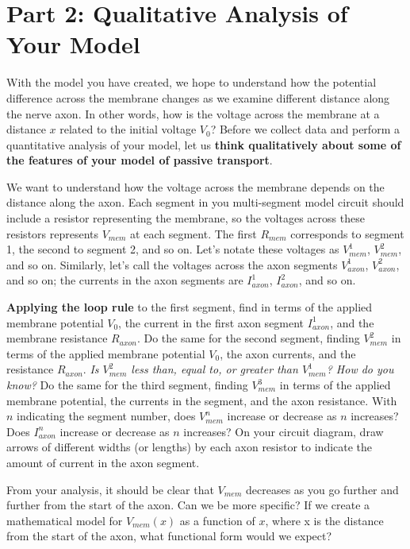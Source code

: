 \section*{Part 2: Qualitative Analysis of Your Model}
With the model you have created, we hope to understand how the potential difference across the membrane changes as we examine different distance along the nerve axon.
In other words, how is the voltage across the membrane at a distance $x$ related to the initial voltage $V_{0}$?
Before we collect data and perform a quantitative analysis of your model, let us \textbf{think qualitatively about some of the features of your model of passive transport}.
\par 
We want to understand how the voltage across the membrane depends on the distance along the axon.
Each segment in you multi-segment model circuit should include a resistor representing the membrane, so the voltages across these resistors represents $V_{mem}$ at each segment.
The first $R_{mem}$ corresponds to segment 1, the second to segment 2, and so on. 
Let's notate these voltages as $V_{mem}^{1}$, $V_{mem}^{2}$, and so on.
Similarly, let's call the voltages across the axon segments $V_{axon}^{1}$, $V_{axon}^{2}$, and so on; the currents in the axon segments are $I_{axon}^{1}$, $I_{axon}^{2}$, and so on.
\par 
\textbf{Applying the loop rule} to the first segment, find in terms of the applied membrane potential $V_{0}$, the current in the first axon segment $I_{axon}^{1}$, and the membrane resistance $R_{axon}$.
Do the same for the second segment, finding $V_{mem}^{2}$ in terms of the applied membrane potential $V_{0}$, the axon currents, and the resistance $R_{axon}$.
\emph{Is $V_{mem}^{2}$ less than, equal to, or greater than $V_{mem}^{1}$? How do you know?}
Do the same for the third segment, finding $V_{mem}^{3}$ in terms of the applied membrane potential, the currents in the segment, and the axon resistance.
With $n$ indicating the segment number, does $V_{mem}^{n}$ increase or decrease as $n$ increases?
Does $I_{axon}^{n}$ increase or decrease as $n$ increases? 
On your circuit diagram, draw arrows of different widths (or lengths) by each axon resistor to indicate the amount of current in the axon segment.
\par 
From your analysis, it should be clear that $V_{mem}$ decreases as you go further and further from the start of the axon.
Can we be more specific?
If we create a mathematical model for $V_{mem}(x)$ as a function of $x$, where x is the distance from the start of the axon, what functional form would we expect?
